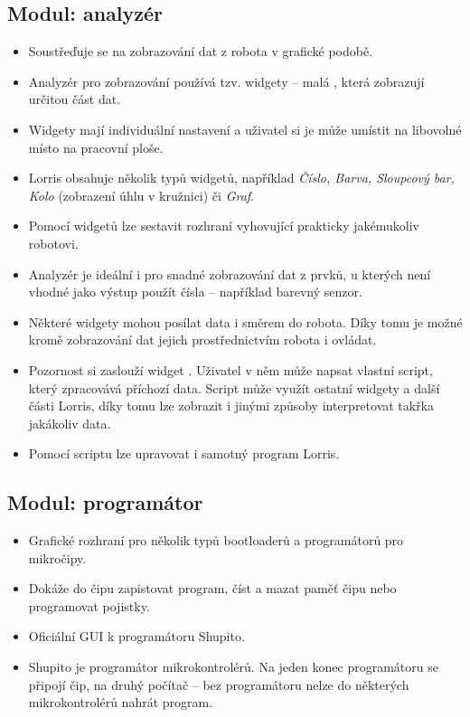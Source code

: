 \documentclass[12pt, a4paper, oneside]{article}
\newcommand{\It}{\textit}  %
\begin{document}
\subsection*{Modul: analyzér}
\begin{itemize} 
    \item Soustřeďuje se na zobrazování dat z robota v grafické podobě.
    \item Analyzér pro zobrazování používá tzv. widgety -- malá , která zobrazují určitou část dat.
    \item Widgety mají individuální nastavení a uživatel si je může umístit na libovolné místo na pracovní ploše.
    \item Lorris obsahuje několik typů widgetů, například \It{Číslo, Barva, Sloupcový bar, Kolo} (zobrazení úhlu v kružnici) či \It{Graf}.
    \item Pomocí widgetů lze sestavit rozhraní vyhovující prakticky jakémukoliv robotovi.
    \item Analyzér je ideální i pro snadné zobrazování dat z prvků, u kterých není vhodné jako výstup použít čísla -- například barevný senzor.
    \item Některé widgety mohou posílat data i směrem do robota. Díky tomu je možné kromě zobrazování dat jejich prostřednictvím robota i ovládat.
    \item Pozornost si zaslouží widget . Uživatel v něm může napsat vlastní script, který zpracovává příchozí data. Script může využít ostatní widgety a další části Lorris, díky tomu lze zobrazit i jinými způsoby interpretovat takřka jakákoliv data.
    \item Pomocí scriptu lze upravovat i samotný program Lorris.
\end{itemize}

\subsection*{Modul: programátor}
\begin{itemize}
    \item Grafické rozhraní pro několik typů bootloaderů a programátorů pro mikročipy.
    \item Dokáže do čipu zapistovat program, číst a mazat paměť čipu nebo programovat pojistky.
    \item Oficiální GUI k programátoru Shupito.
    \item Shupito je programátor mikrokontrolérů. Na jeden konec programátoru se připojí čip, na druhý počítač -- bez programátoru nelze do některých mikrokontrolérů nahrát program.
\end{itemize}
\end{document}
